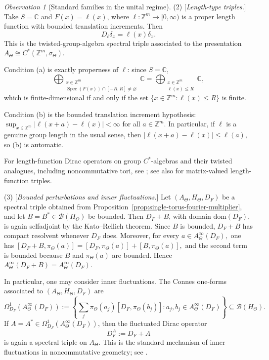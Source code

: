 \documentclass[11pt]{amsart}
\theoremstyle{definition}
\theoremstyle{remark}
\newtheorem{observation}[theorem]{Observation}
\newcommand{\Z}{\mathbb{Z}}
\newcommand{\C}{\mathbb C}
\newcommand{\dom}{\mathrm{dom}}
\begin{document}
\begin{observation}[Standard families in the unital regime]
\noindent

(2) [\emph{Length-type triples.}]
Take $S=\C$ and $F(x)=\ell(x)$, where $\ell\colon\Z^m\to[0,\infty)$
is a proper length function with bounded translation increments. Then
\[
D_\ell\delta_x=\ell(x)\delta_x.
\]
This is the twisted-group-algebra spectral triple associated to the
presentation $A_\Theta\cong C^*(\Z^m,\sigma_\Theta).$

Condition \textup{(a)} is exactly properness of $\ell$: since $S=\C$,
\[
\bigoplus_{\substack{x\in\Z^m\\
\operatorname{Spec}(F(x))\cap[-R,R]\neq\varnothing}}\C
=
\bigoplus_{\substack{x\in\Z^m\\
\ell(x)\le R}}\C,
\]
which is finite-dimensional if and only if the set $\{x\in\Z^m:\ell(x)\le R\}$
is finite.

Condition \textup{(b)} is the bounded translation increment hypothesis:
$\sup_{x\in\Z^m}|\ell(x+a)-\ell(x)|<\infty$ for all
$a\in\Z^m$.
In particular, if $\ell$ is a genuine group length in the usual sense, then
$|\ell(x+a)-\ell(x)|\le \ell(a),$
so \textup{(b)} is automatic.

For length-function Dirac operators on group $C^*$-algebras and their
twisted analogues, including noncommutative tori, see
\cite[Introduction and Section~1]{RieffelGroupCQMS}; see also
\cite{AntoniniGuidoIsolaRubin} for matrix-valued length-function triples.

\smallskip

\noindent

(3) [\emph{Bounded perturbations and inner fluctuations.}]
Let $(A_\Theta,H_\Theta,D_F)$ be a spectral triple obtained from
Proposition~\ref{prop:single-torus-fourier-multiplier}, and let $B=B^*\in\mathcal B(H_\Theta)$
be bounded. Then $D_F+B$, with domain \(\dom(D_F)\), is again selfadjoint by
the Kato--Rellich theorem. Since $B$ is bounded, $D_F+B$ has compact
resolvent whenever $D_F$ does. Moreover, for every $a\in A_\Theta^\infty(D_F),$
one has $[D_F+B,\pi_\Theta(a)]=[D_F,\pi_\Theta(a)]+[B,\pi_\Theta(a)],$
and the second term is bounded because $B$ and $\pi_\Theta(a)$ are bounded.
Hence $A_\Theta^\infty(D_F+B)=A_\Theta^\infty(D_F).$

In particular, one may consider inner fluctuations. The Connes one-forms
associated to $(A_\Theta,H_\Theta,D_F)$ are
\[
\Omega^1_{D_F}(A_\Theta^\infty(D_F))
:=
\left\{
\sum_j \pi_\Theta(a_j)[D_F,\pi_\Theta(b_j)]:
a_j,b_j\in A_\Theta^\infty(D_F)
\right\}
\subseteq \mathcal B(H_\Theta). \]
If $A=A^*\in \Omega^1_{D_F}(A_\Theta^\infty(D_F))$, then the fluctuated Dirac
operator
\[
D_F^A:=D_F+A
\]
is again a spectral triple on $A_\Theta$. This is the standard mechanism of
inner fluctuations in noncommutative geometry; see
\cite[Chapter~VI]{ConnesBook}.


\end{observation}
\end{document}
